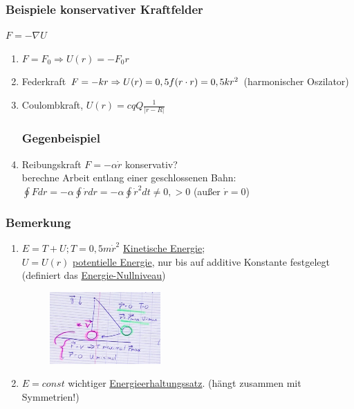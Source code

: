 \subsubsection{Beispiele konservativer Kraftfelder}
$F=-\nabla U$\\
\begin{enumerate}
\item $F=F_0 \Rightarrow U(r)=-F_0r$
\item Federkraft $F=-kr \Rightarrow U(r)=0,5f(r\cdot r)=0,5kr^2$ (harmonischer Oszilator)
\item Coulombkraft, $U(r)=cqQ\frac{1}{|r-R|}$

\subsubsection{Gegenbeispiel}
\item Reibungskraft $F=-\alpha \dot{r}$ konservativ?\\
berechne Arbeit entlang einer geschlossenen Bahn:$\oint Fdr=-\alpha \oint \dot{r}dr=-\alpha \oint \dot{r}^2dt \neq 0, >0$ (außer $\dot{r}=0$)
\end{enumerate}
\subsubsection{Bemerkung}
\begin{enumerate}
\item $E=T+U; T=0,5m\dot{r}^2$ \underline{Kinetische Energie};\\
$U=U(r)$ \underline{potentielle Energie}, nur bis auf additive Konstante festgelegt (definiert das \underline{Energie-Nullniveau})
\begin{figure}[h]
\begin{center}
\includegraphics[width=0.4\textwidth]{Skizzen/Anhang1Kopie.jpg}
\end{center}
\caption{}
\end{figure}
\item $E=const$ wichtiger \underline{Energieerhaltungssatz}. (hängt zusammen mit Symmetrien!)
\end{enumerate}

